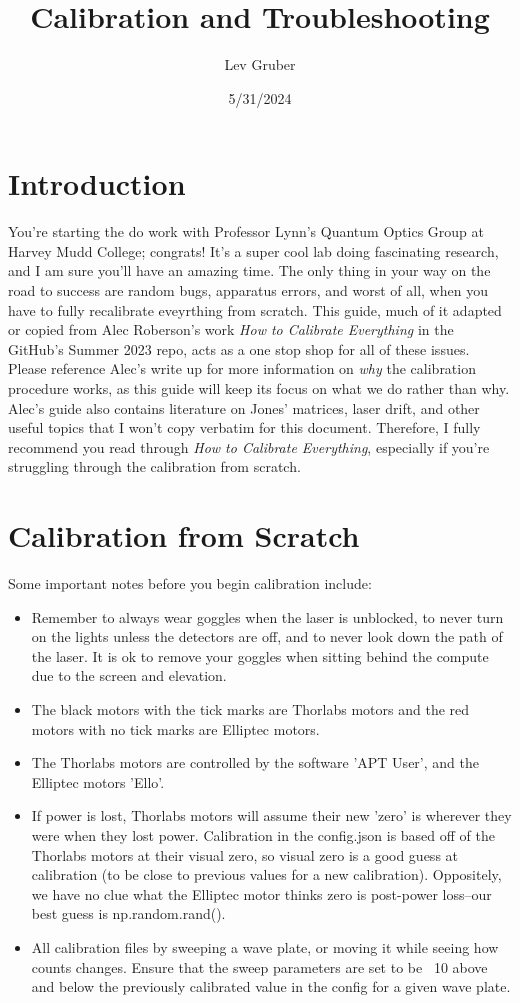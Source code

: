 \documentclass{paper}[11pt]
\title{Calibration and Troubleshooting}
\author{Lev Gruber}
\date{5/31/2024}
\begin{document}
\maketitle 

\tableofcontents
\newpage
\section{Introduction}
You're starting the do work with Professor Lynn's Quantum Optics Group at Harvey Mudd College; congrats! It's a super cool lab doing fascinating research, and I am sure you'll have an amazing time. The only thing in your way on the road to success are random bugs, apparatus errors, and worst of all, when you have to fully recalibrate eveyrthing from scratch. This guide, much of it adapted or copied from Alec Roberson's work \textit{How to Calibrate Everything} in the GitHub's Summer 2023 repo, acts as a one stop shop for all of these issues. Please reference Alec's write up for more information on \textit{why} the calibration procedure works, as this guide will keep its focus on what we do rather than why. Alec's guide also contains literature on Jones' matrices, laser drift, and other useful topics that I won't copy verbatim for this document. Therefore, I fully recommend you read through 
\textit{How to Calibrate Everything}, especially if you're struggling through the calibration from scratch.

\section{Calibration from Scratch}
Some important notes before you begin calibration include:
\begin{itemize}
    \item Remember to always wear goggles when the laser is unblocked, to never turn on the lights unless the detectors are off, and to never look down the path of the laser. It is ok to remove your goggles when sitting behind the compute due to the screen and elevation.
    \item The black motors with the tick marks are Thorlabs motors and the red motors with no tick marks are Elliptec motors.
    \item The Thorlabs motors are controlled by the software 'APT User', and the Elliptec motors 'Ello'.
    \item If power is lost, Thorlabs motors will assume their new 'zero' is wherever they were when they lost power. Calibration in the config.json is based off of the Thorlabs motors at their visual zero, so visual zero is a good guess at calibration (to be close to previous values for a new calibration). Oppositely, we have no clue what the Elliptec motor thinks zero is post-power loss--our best guess is np.random.rand().
    \item All calibration files by sweeping a wave plate, or moving it while seeing how counts changes. Ensure that the sweep parameters are set to be ~10 above and below the previously calibrated value in the config for a given wave plate. 
\end{itemize}
\end{document}
